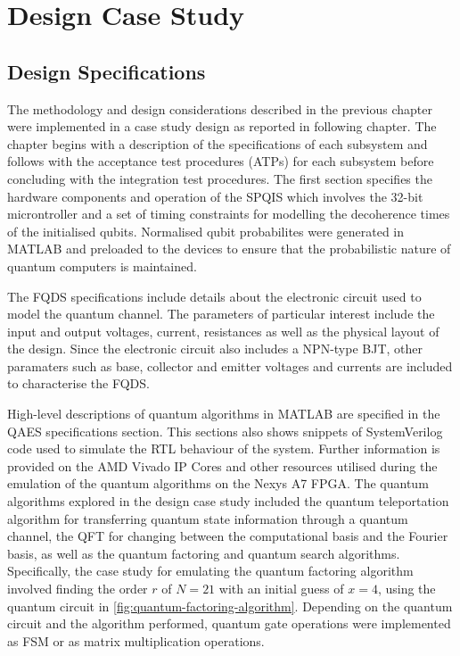 \chapter{\label{ch:ch5} Design Case Study}

\section{Design Specifications \label{sec:design-specs}}

The methodology and design considerations described in the previous chapter were implemented in a case study design as reported in following chapter. The chapter begins with a description of the specifications of each subsystem and follows with the acceptance test procedures (ATPs) for each subsystem before concluding with the integration test procedures. The first section specifies the hardware components and operation of the SPQIS which involves the 32-bit microntroller and a set of timing constraints for modelling the decoherence times of the initialised qubits. Normalised qubit probabilites were generated in MATLAB and preloaded to the devices to ensure that the probabilistic nature of quantum computers is maintained. 

The FQDS specifications include details about the electronic circuit used to model the quantum channel. The parameters of particular interest include the input and output voltages, current, resistances as well as the physical layout of the design. Since the electronic circuit also includes a NPN-type BJT, other paramaters such as base, collector and emitter voltages and currents are included to characterise the FQDS. 

High-level descriptions of quantum algorithms in MATLAB are specified in the QAES specifications section. This sections also shows snippets of SystemVerilog code used to simulate the RTL behaviour of the system. Further information is provided on the AMD Vivado IP Cores and other resources utilised during the emulation of the quantum algorithms on the Nexys A7 FPGA. The quantum algorithms explored in the design case study included the quantum teleportation algorithm for transferring quantum state information through a quantum channel, the QFT for changing between the computational basis and the Fourier basis, as well as the quantum factoring and quantum search algorithms. Specifically, the case study for emulating the quantum factoring algorithm involved finding the order $r$ of $N = 21$ with an initial guess of $x = 4$, using the quantum circuit in \ref{fig:quantum-factoring-algorithm}. Depending on the quantum circuit and the algorithm performed, quantum gate operations were implemented as FSM or as matrix multiplication operations. 

